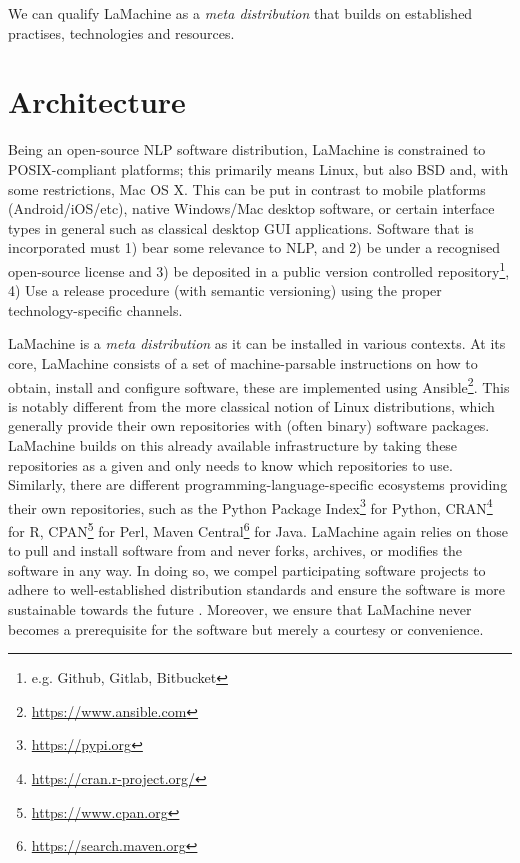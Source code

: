 \documentclass[a4paper,11pt]{article}
\begin{document}
We can qualify LaMachine as a \emph{meta distribution} that builds on established practises, technologies and resources.

\section{Architecture}

Being an open-source NLP software distribution, LaMachine is constrained to POSIX-compliant platforms; this primarily
means Linux, but also BSD and, with some restrictions, Mac OS X. This can be put in contrast to mobile platforms
(Android/iOS/etc), native Windows/Mac desktop software, or certain interface types in general such as classical desktop
GUI applications. Software that is incorporated must 1) bear some relevance to NLP, and 2) be under a recognised
open-source license and 3) be deposited in a public version controlled repository\footnote{e.g. Github, Gitlab,
Bitbucket}, 4) Use a release procedure (with semantic versioning) using the proper technology-specific channels.

LaMachine is a \emph{meta distribution} as it can be installed in various contexts. At its core, LaMachine consists of a
set of machine-parsable instructions on how to obtain, install and configure software, these are implemented using
Ansible\footnote{\url{https://www.ansible.com}}.  This is notably different from the more classical notion of Linux
distributions, which generally provide their own repositories with (often binary) software packages. LaMachine builds on
this already available infrastructure by taking these repositories as a given and only needs to know which
repositories to use.  Similarly, there are different programming-language-specific ecosystems providing their own
repositories, such as the Python Package Index\footnote{\url{https://pypi.org}} for Python,
CRAN\footnote{\url{https://cran.r-project.org/}} for R, CPAN\footnote{\url{https://www.cpan.org}} for Perl, Maven
Central\footnote{\url{https://search.maven.org}} for Java.  LaMachine again relies on those to pull and install
software from and never forks, archives, or modifies the software in any way. In doing so, we compel participating
software projects to adhere to well-established distribution standards and ensure the software is more sustainable
towards the future \cite{softwarequality}. Moreover, we ensure that LaMachine never becomes a prerequisite for the software but merely a
courtesy or convenience.
\end{document}
